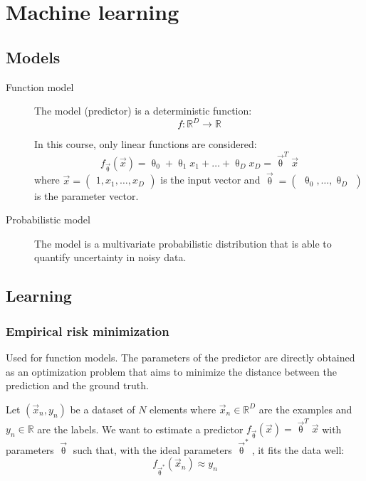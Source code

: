 \chapter{Machine learning}


\section{Models}

\begin{description}
    \item[Function model] 
        The model (predictor) is a deterministic function:
        \[ f: \mathbb{R}^D \rightarrow \mathbb{R} \]

        In this course, only linear functions are considered:
        \[ f_\vec{\uptheta}(\vec{x}) = \uptheta_0 + \uptheta_1 x_1 + \dots + \uptheta_D x_D = \vec{\uptheta}^T \vec{x} \]
        where $\vec{x} = \begin{pmatrix} 1, x_1, \dots, x_D \end{pmatrix}$ is the input vector and
        $\vec{\uptheta} = \begin{pmatrix} \uptheta_0, \dots, \uptheta_D \end{pmatrix}$ is the parameter vector.

    \item[Probabilistic model] 
        The model is a multivariate probabilistic distribution that 
        is able to quantify uncertainty in noisy data.
\end{description}



\section{Learning}


\subsection{Empirical risk minimization}
Used for function models.
The parameters of the predictor are directly obtained as an optimization problem that aims to minimize the distance
between the prediction and the ground truth.

Let $(\vec{x}_n, y_n)$ be a dataset of $N$ elements
where $\vec{x}_n \in \mathbb{R}^D$ are the examples and $y_n \in \mathbb{R}$ are the labels.
We want to estimate a predictor $f_\vec{\uptheta}(\vec{x}) = \vec{\uptheta}^T \vec{x}$ with parameters $\vec{\uptheta}$
such that, with the ideal parameters $\vec{\uptheta}^*$, it fits the data well:
\[ f_{\vec{\uptheta}^*}(\vec{x}_n) \approx y_n \]

